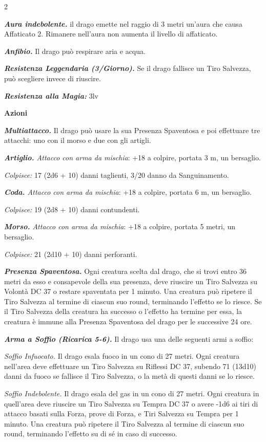 \begin{multicols}{2}
{\emph{\textbf{Aura indebolente.}} il drago emette nel raggio di 3 metri un'aura che causa Affaticato 2. Rimanere nell'aura non aumenta il livello di affaticato.

\emph{\textbf{Anfibio.}} Il drago può respirare aria e acqua.

\emph{\textbf{Resistenza Leggendaria (3/Giorno).}} Se il drago fallisce un Tiro Salvezza, può scegliere invece di riuscire.

\emph{\textbf{Resistenza alla Magia:}} 3lv

\textbf{Azioni}

\emph{\textbf{Multiattacco.}} Il drago può usare la sua Presenza Spaventosa e poi effettuare tre attacchi: uno con il morso e due con gli artigli.

\emph{\textbf{Artiglio.} Attacco con arma da mischia}: +18 a colpire, portata 3 m, un bersaglio.

\emph{Colpisce:} 17 (2d6 + 10) danni taglienti, 3/20 danno da Sanguinamento.

\emph{\textbf{Coda.} Attacco con arma da mischia}: +18 a colpire, portata 6 m, un bersaglio.

\emph{Colpisce:} 19 (2d8 + 10) danni contundenti.

\emph{\textbf{Morso.} Attacco con arma da mischia}: +18 a colpire, portata 5 metri, un bersaglio.

\emph{Colpisce:} 21 (2d10 + 10) danni perforanti.

\emph{\textbf{Presenza Spaventosa.}} Ogni creatura scelta dal drago, che si trovi entro 36 metri da esso e consapevole della sua presenza, deve riuscire un Tiro Salvezza su Volontà DC 37 o restare spaventata per 1 minuto. Una creatura può ripetere il Tiro Salvezza al termine di ciascun suo round, terminando l'effetto se lo riesce. Se il Tiro Salvezza della creatura ha successo o l'effetto ha termine per essa, la creatura è immune alla Presenza Spaventosa del drago per le successive 24 ore.

\emph{\textbf{Arma a Soffio (Ricarica 5-6).}} Il drago usa una delle seguenti armi a soffio:

\emph{Soffio Infuocato.} Il drago esala fuoco in un cono di 27 metri. Ogni creatura nell'area deve effettuare un Tiro Salvezza su Riflessi DC 37, subendo 71 (13d10) danni da fuoco se fallisce il Tiro Salvezza, o la metà di questi danni se lo riesce.

\emph{Soffio Indebolente.} Il drago esala del gas in un cono di 27 metri. Ogni creatura in quell'area deve riuscire un Tiro Salvezza su Tempra DC 37 o avere -1d6 ai tiri di attacco basati sulla Forza, prove di Forza, e Tiri Salvezza su Tempra per 1 minuto. Una creatura può ripetere il Tiro Salvezza al termine di ciascun suo round, terminando l'effetto su di sé in caso di successo.

}
\end{multicols}
